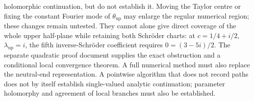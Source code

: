 \begin{remark}
holomorphic continuation, but do not establish it. Moving the Taylor centre
or fixing the constant Fourier mode of $\theta_{\mathrm{up}}$ may enlarge
the regular numerical region; these changes remain untested. They cannot
alone give direct coverage of the whole upper half-plane while retaining
both Schr\"oder charts: at $c=1/4+i/2$, $\lambda_{\mathrm{up}}=i$, the
fifth inverse-Schr\"oder coefficient requires $0=(3-5i)/2$.
The separate quadratic proof document supplies the exact obstruction and
a conditional local convergence theorem. A full numerical method must
also replace the neutral-end representation.
A pointwise algorithm that does not record paths does not by itself establish
single-valued analytic continuation; parameter holomorphy and agreement of
local branches must also be established.
\end{remark}
